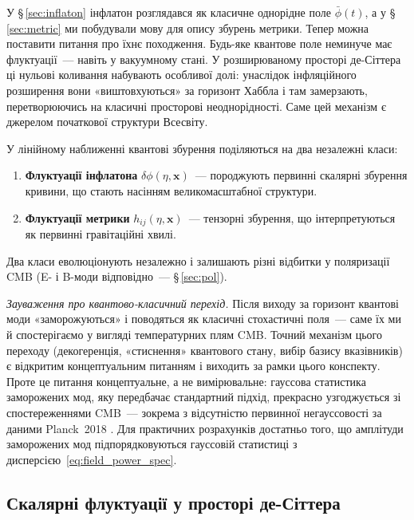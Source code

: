 \documentclass[12pt, a4paper]{article}
\begin{document}
У §\,\ref{sec:inflaton} інфлатон розглядався як класичне однорідне
поле $\bar{\phi}(t)$, а у §\,\ref{sec:metric} ми побудували мову
для опису збурень метрики. Тепер можна поставити питання про
їхнє походження. Будь-яке квантове поле неминуче має
флуктуації~--- навіть у вакуумному стані. У розширюваному просторі
де-Сіттера ці нульові коливання набувають особливої долі: унаслідок
інфляційного розширення вони «виштовхуються» за горизонт Хаббла і
там замерзають, перетворюючись на класичні просторові неоднорідності.
Саме цей механізм є джерелом початкової структури Всесвіту.

У лінійному наближенні квантові збурення поділяються на два
незалежні класи:
\begin{enumerate}
  \item \textbf{Флуктуації інфлатона} $\delta\phi(\eta, \mathbf{x})$~---
        породжують первинні скалярні збурення кривини, що стають
        насінням великомасштабної структури.
  \item \textbf{Флуктуації метрики} $h_{ij}(\eta, \mathbf{x})$~---
        тензорні збурення, що інтерпретуються як первинні
        гравітаційні хвилі.
\end{enumerate}
Два класи еволюціонують незалежно і залишають різні відбитки
у поляризації CMB (E- і B-моди відповідно~--- §\,\ref{sec:pol}).

\textit{Зауваження про квантово-класичний перехід.}
Після виходу за горизонт квантові моди «заморожуються» і
поводяться як класичні стохастичні поля~--- саме їх ми й
спостерігаємо у вигляді температурних плям CMB. Точний механізм
цього переходу (декогеренція, «стиснення» квантового стану,
вибір базису вказівників) є відкритим концептуальним питанням
і виходить за рамки цього конспекту. Проте це питання
концептуальне, а не вимірювальне: гауссова статистика заморожених
мод, яку передбачає стандартний підхід, прекрасно узгоджується зі
спостереженнями CMB~--- зокрема з відсутністю первинної
негауссовості за даними Planck~2018 \cite{planck_2018}.
Для практичних розрахунків достатньо того, що амплітуди
заморожених мод підпорядковуються гауссовій статистиці з
дисперсією~\eqref{eq:field_power_spec}.

\subsection{Скалярні флуктуації у просторі де-Сіттера}
\end{document}
